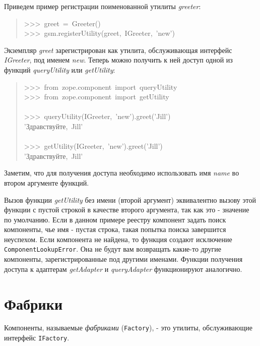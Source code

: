 \documentclass[14pt,a4paper,openany,twoside,final]{extbook}
\providecommand*{\DUroletitlereference}[1]{\textsl{#1}}
\begin{document}
Приведем пример регистрации поименованной утилиты \DUroletitlereference{greeter}:

\begin{quote}{\ttfamily \raggedright \noindent
>{}>{}>~greet~=~Greeter()\\
>{}>{}>~gsm.registerUtility(greet,~IGreeter,~'new')
}
\end{quote}

Экземпляр \DUroletitlereference{greet} зарегистрирован как утилита, обслуживающая
интерфейс \DUroletitlereference{IGreeter}, под именем \DUroletitlereference{new}.  Теперь можно получить к ней
доступ одной из функций \DUroletitlereference{queryUtility} или \DUroletitlereference{getUtility}:

\begin{quote}{\ttfamily \raggedright \noindent
>{}>{}>~from~zope.component~import~queryUtility\\
>{}>{}>~from~zope.component~import~getUtility\\
~\\
>{}>{}>~queryUtility(IGreeter,~'new').greet('Jill')\\
'Здравствуйте,~Jill'\\
~\\
>{}>{}>~getUtility(IGreeter,~'new').greet('Jill')\\
'Здравствуйте,~Jill'
}
\end{quote}

Заметим, что для получения доступа необходимо использовать имя \DUroletitlereference{name}
во втором аргументе функций.

Вызов функции \DUroletitlereference{getUtility} без имени (второй аргумент) эквивалентно
вызову этой функции с пустой строкой в качестве второго аргумента, так
как это - значение по умолчанию.  Если в данном примере реестру
компонент задать поиск компоненты, чье имя - пустая строка, такая
попытка поиска завершится неуспехом.  Если компонента не найдена, то
функция создают исключение \texttt{ComponentLookupError}.  Она не будут вам
возвращать какие-то другие компоненты, зарегистрированные под другими
именами.  Функции получения доступа к адаптерам \DUroletitlereference{getAdapter} и
\DUroletitlereference{queryAdapter} функционируют аналогично.


\section{Фабрики%
  \label{id43}%
}

Компоненты, называемые \DUroletitlereference{фабриками} (\texttt{Factory}), - это утилиты,
обслуживающие интерфейс \texttt{IFactory}.
\end{document}
